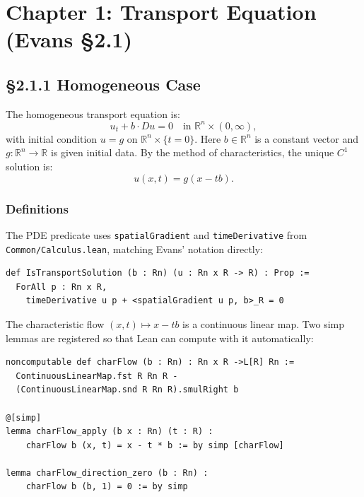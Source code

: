 ﻿\documentclass[12pt, a4paper]{article}
\renewcommand{\_}{\origunderscore\allowbreak}
\theoremstyle{definition}
\theoremstyle{plain}
\begin{document}
\section{Chapter 1: Transport Equation (Evans §2.1)}

\subsection{§2.1.1 Homogeneous Case}

The homogeneous transport equation is:
\begin{equation}
  u_t + b \cdot Du = 0 \quad \text{in } \mathbb{R}^n \times (0, \infty),
  \label{eq:transport}
\end{equation}
with initial condition $u = g$ on $\mathbb{R}^n \times \{t = 0\}$.
Here $b \in \mathbb{R}^n$ is a constant vector and $g : \mathbb{R}^n \to \mathbb{R}$
is given initial data. By the method of characteristics, the unique $C^1$ solution is:
\[
  u(x, t) = g(x - tb).
\]

\subsubsection{Definitions}

The PDE predicate uses \texttt{spatialGradient} and \texttt{timeDerivative}
from \texttt{Common/\allowbreak Calculus.\allowbreak lean}, matching Evans' notation directly:

\begin{lstlisting}[caption={PDE predicate}]
def IsTransportSolution (b : Rn) (u : Rn x R -> R) : Prop :=
  ForAll p : Rn x R,
    timeDerivative u p + <spatialGradient u p, b>_R = 0
\end{lstlisting}

The characteristic flow $(x,t) \mapsto x - tb$ is a continuous linear map.
Two simp lemmas are registered so that Lean can compute with it automatically:

\begin{lstlisting}[caption={Characteristic flow}]
noncomputable def charFlow (b : Rn) : Rn x R ->L[R] Rn :=
  ContinuousLinearMap.fst R Rn R -
  (ContinuousLinearMap.snd R Rn R).smulRight b

@[simp]
lemma charFlow_apply (b x : Rn) (t : R) :
    charFlow b (x, t) = x - t * b := by simp [charFlow]

lemma charFlow_direction_zero (b : Rn) :
    charFlow b (b, 1) = 0 := by simp
\end{lstlisting}
\end{document}
